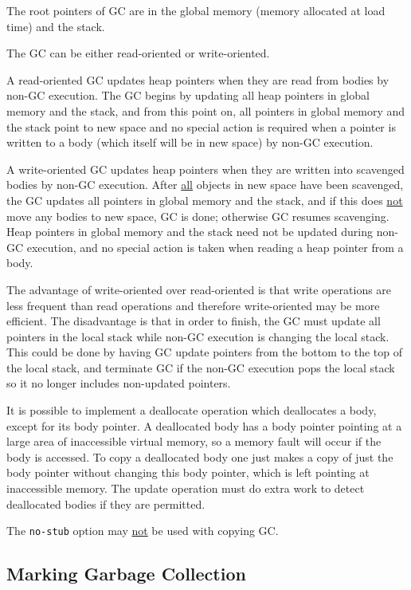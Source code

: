 \documentclass[12pt]{article}
\begin{document}
The root pointers of GC are in the global memory (memory
allocated at load time) and the stack.

The GC can be either read-oriented or write-oriented.

A read-oriented GC updates heap pointers when they are read
from bodies by non-GC execution.
The GC begins by updating all heap pointers in global memory
and the stack, and from this point on, all pointers in global
memory and the stack
point to new space and no special action is required when
a pointer is written to a body (which itself will be in new
space) by non-GC execution.

A write-oriented GC updates heap pointers when they are
written into scavenged bodies by non-GC execution.
After \underline{all} objects in new space have been scavenged,
the GC updates all pointers in global memory and the stack,
and if this does \underline{not}
move any bodies to new space, GC is done; otherwise
GC resumes scavenging.  Heap pointers in global memory and the stack need
not be updated during non-GC execution, and no special action is taken
when reading a heap pointer from a body.

The advantage of write-oriented over read-oriented is
that write operations are less frequent than read
operations and therefore write-oriented may be more
efficient.  The disadvantage is that in order to finish, the GC
must update all pointers in the local stack while
non-GC execution is changing the local stack.
This could be done by having GC update pointers from the bottom
to the top of the local stack, and terminate GC if the non-GC execution
pops the local stack so it no longer includes non-updated pointers.

It is possible to implement a deallocate operation
which deallocates a body, except for its body pointer.
A deallocated body has a body pointer pointing at
a large area of inaccessible virtual memory, so a
memory fault will occur if the body is accessed.
To copy a deallocated body one just makes a copy
of just the body pointer without changing this body pointer,
which is left pointing at inaccessible memory.
The update operation must do extra work to detect
deallocated bodies if they are permitted.

The {\tt no-stub} option may \underline{not} be used with
copying GC.

\subsection{Marking Garbage Collection}
\end{document}
